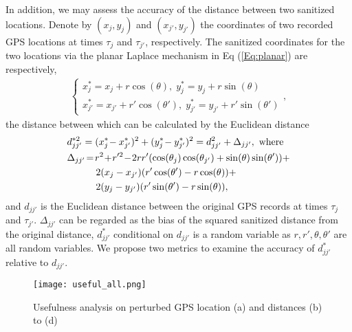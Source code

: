 \documentclass[10pt,journal,compsoc]{IEEEtran}
\begin{document}
In addition, we may assess the accuracy of the distance between two  sanitized  locations.  Denote by $(x_j,y_j)$ and  $(x_{j'},y_{j'})$ the coordinates  of two recorded GPS locations at times $\tau_j$ and $\tau_{j'}$, respectively. The sanitized coordinates for the two locations via the planar Laplace mechanism in Eq (\ref{Eq:planar})  are respectively, 
\begin{align}
\begin{cases}
x^*_j=x_j+r\cos(\theta),\; y^*_j=y_j+r\sin(\theta)\\
x^*_{j'}=x_{j'}+r'\cos(\theta'),\; y^*_{j'}=y_{j'}+r'\sin(\theta')
\end{cases},
\end{align}
the distance between which can be calculated by the Euclidean distance 
\begin{align}
&d^{*2}_{jj'} = (x^*_j\!-x^*_{j'})^2 +(y^*_j\!-y^*_{j'})^2 = d^2_{jj'} +\Delta_{jj'},\mbox{ where}\label{Eq:dgeneral}\\
&\Delta_{jj'}\!=\!r^2\!+\!r'^2\!-\! 2rr'(\cos(\theta_j)\cos(\theta_{j'})+\sin(\theta)\sin(\theta'))+\notag\\ 
&\qquad\quad2(x_j-x_{j'})(r'\cos(\theta')-r\cos(\theta))+\notag\\ 
&\qquad\quad2(y_j-y_{j'})(r'\sin(\theta')-r\sin(\theta)),\label{Eq:delta}
\end{align}
and $d_{jj'}$ is the Euclidean distance between the original GPS records at times $\tau_j$ and $\tau_{j'}$. $\Delta_{jj'}$ can be regarded as the bias of the squared sanitized distance from the original distance,  $d^*_{jj'}$ conditional on  $d_{jj'}$  is a random variable as $r,r',\theta,\theta'$ are all random variables. We propose two metrics to examine the accuracy of $d^*_{jj'}$ relative to $d_{jj'}$. 
\begin{figure*}[t]
\texttt{[image: useful\_all.png]}\vspace{-3pt}
\caption{Usefulness analysis on perturbed GPS location (a) and distances (b) to (d)} \label{fig:useful}\vspace{-9pt}
\end{figure*} 
\end{document}
